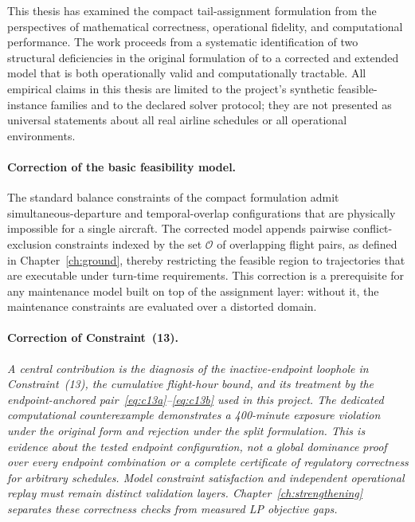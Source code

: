 This thesis has examined the compact tail-assignment formulation from the perspectives of mathematical correctness, operational fidelity, and computational performance. The work proceeds from a systematic identification of two structural deficiencies in the original formulation of \citet{khaled2018compact} to a corrected and extended model that is both operationally valid and computationally tractable. All empirical claims in this thesis are limited to the project’s synthetic feasible-instance families and to the declared solver protocol; they are not presented as universal statements about all real airline schedules or all operational environments.

\paragraph{Correction of the basic feasibility model.}
The standard balance constraints of the compact formulation admit simultaneous-departure and temporal-overlap configurations that are physically impossible for a single aircraft. The corrected model appends pairwise conflict-exclusion constraints indexed by the set $\mathcal{O}$ of overlapping flight pairs, as defined in Chapter~\ref{ch:ground}, thereby restricting the feasible region to trajectories that are executable under turn-time requirements. This correction is a prerequisite for any maintenance model built on top of the assignment layer: without it, the maintenance constraints are evaluated over a distorted domain.

\paragraph{Correction of Constraint~(13).}
\textit{A central contribution is the diagnosis of the inactive-endpoint
loophole in Constraint~(13), the cumulative flight-hour bound, and its treatment
by the endpoint-anchored pair~\eqref{eq:c13a}--\eqref{eq:c13b} used in this
project. The dedicated computational counterexample demonstrates a
400-minute exposure violation under the original form and rejection under the
split formulation. This is evidence about the tested endpoint configuration,
not a global dominance proof over every endpoint combination or a complete
certificate of regulatory correctness for arbitrary schedules. Model
constraint satisfaction and independent operational replay must remain
distinct validation layers. Chapter~\ref{ch:strengthening} separates these
correctness checks from measured LP objective gaps.}

